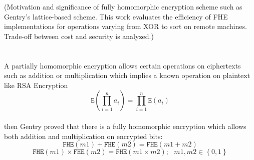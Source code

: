 \documentclass{acm_proc_article-sp}
\begin{document}
(Motivation and significance of fully homomorphic encryption scheme such as Gentry's lattice-based scheme.  
This work evaluates the efficiency of FHE implementations for operations varying from XOR to sort on remote machines. Trade-off between cost and security is analyzed.) \\\\\\
A partially homomorphic encryption allows certain operations on ciphertexts such as addition or multiplication which implies a known operation on plaintext like RSA Encryption
\[\texttt{E}(\prod_{i=1}^{n}{a_i}) = \prod_{i=1}^{n}{\texttt{E}(a_i)}\] \\
then Gentry proved that there is a fully homomorphic encryption which allows both addition and multiplication on encrypted bits: 
\[\texttt{FHE}(m1) + \texttt{FHE} (m2) = \texttt{FHE}(m1+m2) \] 
\[\texttt{FHE}(m1) \times \texttt{FHE} (m2) = \texttt{FHE}(m1 \times m2) ;\ \ \ m1, m2 \in \left\{ 0, 1 \right\}\] 
\\\\\\\\\\\\\\\\\\\\\\\\\\\\\\\\\\\\\\\\\\\\\\\\\\\\\\\\\\\\\\\\\\\\\\\\\\\\\\\\\\\\\\\\\\\\\\\\\\\\\\
\end{document}
